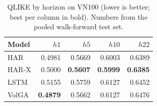 \begin{table}[t]
\centering
\caption{QLIKE by horizon on VN100 (lower is better; best per column in bold). Numbers from the pooled walk-forward test set.}
\label{tab:qlike_vn100}
\begin{tabular}{lrrrr}
\toprule
Model & $h1$ & $h5$ & $h10$ & $h22$ \\
\midrule
HAR & 0.4981 & 0.5669 & 0.6003 & 0.6389 \\
HAR-X & 0.5000 & \textbf{0.5607} & \textbf{0.5999} & \textbf{0.6385} \\
LSTM & 0.5155 & 0.5759 & 0.6127 & 0.6452 \\
VolGA & \textbf{0.4879} & 0.5662 & 0.6127 & 0.6476 \\
\bottomrule
\end{tabular}
\end{table}
